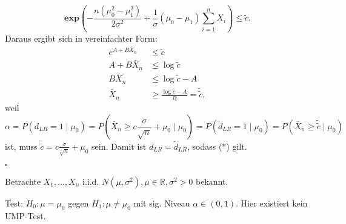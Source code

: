 \documentclass[10pt]{article}
\newcommand{\FZV}{X_1, \ldots, X_n} %
\newcommand{\IR}{\mathbb{R}} %
\newcommand{\sni}{\sum_{i=1}^{n}} %
\newcommand{\dlr}{d_{LR}}%
\newenvironment{BWS}[1][]
{\begin{Beweis}[frametitle=#1]}{\end{Beweis}}
\begin{document}
\begin{BWS}[Beweis 2.1.2 (UMP z-Test)]
			\begin{equation*}
				\textbf{exp}\left(-\frac{n(\mu_0^2-\mu_1^2)}{2 \sigma^2}+ \frac{1}{\sigma}(\mu_0 - \mu_1)\sni X_i\right) \leq \tilde{c}.
			\end{equation*}
			Daraus ergibt sich in vereinfachter Form:
			\begin{equation*}
				\begin{split}
					e^{A+B\bar{X}_n} &\leq \tilde{c}\\
					A+B\bar{X}_n &\leq \log\tilde{c}\\
					B \bar{X}_n &\leq \log\tilde{c} - A\\
					\bar{X}_n &\geq \frac{\log \tilde{c}-A}{B} = \tilde{\tilde{c}},
				\end{split}
			\end{equation*}
			weil
			\begin{equation*}
				\alpha = P(\dlr = 1 \mid \mu_0) = P\left(\bar{X}_n \geq c \frac{\sigma}{\sqrt{n}} + \mu_0 \mid \mu_0 \right) = P(\tilde{d}_{LR} = 1 \mid \mu_0) = P(\bar{X}_n \geq \tilde{\tilde{c}} \mid \mu_0)
			\end{equation*}
			ist, muss $\tilde{\tilde{c}} = c \frac{\sigma}{\sqrt{n}} + \mu_0$ sein. Damit ist $\dlr = \tilde{d}_{LR}$, sodass (*) gilt. 
			
			\begin{flushright}
				$\square$
			\end{flushright}
			\end{BWS}
			
			\begin{Korollar}
				Betrachte $\FZV$ i.i.d. $N(\mu, \sigma^2), \mu \in \IR, \sigma^2 >0$ bekannt. 
				
				Test: $H_0: \mu = \mu_0$ gegen $H_1: \mu \neq \mu_0$ mit sig. Niveau $\alpha \in (0,1)$. Hier existiert kein UMP-Test. 
			\end{Korollar}
			
\end{document}
